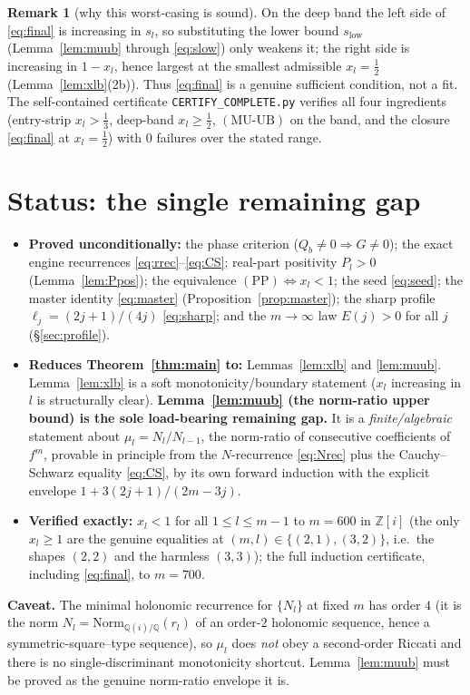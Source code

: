 \documentclass[11pt]{article}
\theoremstyle{definition}
\newtheorem{remark}{Remark}
\newcommand{\Z}{\mathbb{Z}}
\newcommand{\Q}{\mathbb{Q}}
\newcommand{\Zi}{\Z[i]}
\begin{document}
\begin{remark}[why this worst-casing is sound]
On the deep band the left side of \eqref{eq:final} is increasing in
$s_l$, so substituting the lower bound $s_{\mathrm{low}}$
(Lemma~\ref{lem:muub} through \eqref{eq:slow}) only weakens it; the right
side is increasing in $1-x_l$, hence largest at the smallest admissible
$x_l=\tfrac12$ (Lemma~\ref{lem:xlb}(2b)).  Thus \eqref{eq:final} is a
genuine sufficient condition, not a fit.  The self-contained certificate
\texttt{CERTIFY\_COMPLETE.py} verifies all four ingredients
(entry-strip $x_l>\tfrac13$, deep-band $x_l\ge\tfrac12$, $(\mathrm{MU\text{-}UB})$
on the band, and the closure \eqref{eq:final} at $x_l=\tfrac12$) with $0$
failures over the stated range.
\end{remark}

\section{Status: the single remaining gap}\label{sec:status}

\begin{itemize}
\item \textbf{Proved unconditionally:} the phase criterion
($Q_b\neq0\Rightarrow G\neq0$); the exact engine recurrences
\eqref{eq:rrec}--\eqref{eq:CS}; real-part positivity $P_l>0$
(Lemma~\ref{lem:Ppos}); the equivalence
$(\mathrm{PP})\Leftrightarrow x_l<1$; the seed \eqref{eq:seed}; the master
identity \eqref{eq:master} (Proposition~\ref{prop:master}); the sharp
profile $\ell_j=(2j+1)/(4j)$ \eqref{eq:sharp}; and the $m\to\infty$ law
$E(j)>0$ for all $j$ (\S\ref{sec:profile}).
\item \textbf{Reduces Theorem~\ref{thm:main} to:} Lemmas~\ref{lem:xlb}
and \ref{lem:muub}.  Lemma~\ref{lem:xlb} is a soft monotonicity/boundary
statement ($x_l$ increasing in $l$ is structurally clear).
\textbf{Lemma~\ref{lem:muub} (the norm-ratio upper bound) is the sole
load-bearing remaining gap.}  It is a \emph{finite/algebraic} statement
about $\mu_l=N_l/N_{l-1}$, the norm-ratio of consecutive coefficients of
$f^m$, provable in principle from the $N$-recurrence \eqref{eq:Nrec} plus
the Cauchy--Schwarz equality \eqref{eq:CS}, by its own forward induction
with the explicit envelope $1+3(2j+1)/(2m-3j)$.
\item \textbf{Verified exactly:} $x_l<1$ for all $1\le l\le m-1$ to
$m=600$ in $\Zi$ (the only $x_l\ge1$ are the genuine equalities at
$(m,l)\in\{(2,1),(3,2)\}$, i.e.\ the shapes $(2,2)$ and the harmless
$(3,3)$); the full induction certificate, including \eqref{eq:final}, to
$m=700$.
\end{itemize}

\noindent\textbf{Caveat.}  The minimal holonomic recurrence for $\{N_l\}$
at fixed $m$ has order $4$ (it is the norm
$N_l=\mathrm{Norm}_{\Q(i)/\Q}(r_l)$ of an order-$2$ holonomic sequence,
hence a symmetric-square--type sequence), so $\mu_l$ does \emph{not} obey
a second-order Riccati and there is no single-discriminant monotonicity
shortcut.  Lemma~\ref{lem:muub} must be proved as the genuine norm-ratio
envelope it is.
\end{document}

